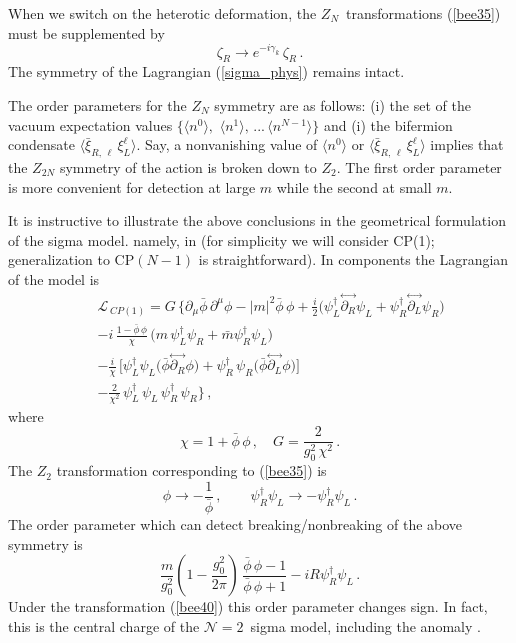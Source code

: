 \documentclass[epsfig,12pt]{article}
\def\beq{\begin{equation}}
\def\eeq{\end{equation}}
\def\beqn{\begin{eqnarray}}
\def\eeqn{\end{eqnarray}}
\newcommand{\ntwo}{${\mathcal N}=2\,$}
\newcommand{\zn}{$Z_N$}
\def\beqn{\begin{eqnarray}}
\def\eeqn{\end{eqnarray}}
\def\beq{\begin{equation}}
\def\eeq{\end{equation}}
\begin{document}
{When we switch on the heterotic deformation, the \zn\, transformations (\ref{bee35}) must be supplemented by
\beq
\zeta_R \to  e^{-i\gamma_k }\, \zeta_R\,.
\label{bee35p}
\eeq
The symmetry of the Lagrangian (\ref{sigma_phys}) remains intact.


The order parameters for the $Z_N$ symmetry are as follows:
(i) the set of the vacuum expectation values
$\{ \langle n^0\rangle,\,\, \langle n^1\rangle, \,...\, \langle n^{N-1}\rangle\}$
and (i) the bifermion condensate $\langle  \bar\xi_{R,\,\ell}\,\xi^\ell_L\rangle$.
Say, a nonvanishing value of $\langle n^0\rangle$ or  $\langle  \bar\xi_{R,\,\ell}\,\xi^\ell_L\rangle$ implies that the $Z_{2N}$ symmetry of the action is broken down to
$Z_2$. The first order parameter is more convenient for detection
at large $m$ while the second at small $m$. 

It is instructive to illustrate the above conclusions
in  the geometrical  formulation of the sigma model. namely, in
(for simplicity we will consider CP(1); generalization to CP$(N-1)$ is straightforward).
In components the Lagrangian of the model is
\beqn
&&
{\mathcal L}_{\,  CP(1)}= G\, \Big\{
\partial_\mu \bar{\phi}\, \partial^\mu\phi -|m|^2{\bar{\phi}\,\phi} 
+\frac{i}{2}\big(\psi_L^\dagger\!\stackrel{\leftrightarrow}{\partial_R}\!\psi_L 
+ \psi_R^\dagger\!\stackrel{\leftrightarrow}{\partial_L}\!\psi_R
\big)
\nonumber\\[1mm] 
&&
-i\,\frac{1-\bar{\phi}\,\phi}{\chi} \,\big(m\,\psi_L^\dagger \psi_R + \bar m
\psi_R^\dagger \psi_L
\big)
\nonumber\\[1mm] 
&&
-\frac{i}{\chi}\,  \big[\psi_L^\dagger \psi_L
\big(\bar{\phi} \!\stackrel{\leftrightarrow}{\partial_R}\!\phi
\big)+ \psi_R^\dagger\, \psi_R
\big(\bar{\phi}\!\stackrel{\leftrightarrow}{\partial_L}\!\phi
\big)
\big]
\nonumber\\[1mm]
&&
-
\frac{2}{\chi^2}\,\psi_L^\dagger\,\psi_L \,\psi_R^\dagger\,\psi_R
\Big\}\,,
\label{Aone}
\eeqn
where 
\beq
\chi = 1+\bar{\phi}\,\phi\,,\quad G= \frac{2}{g_0^2\,\chi^2}\,.
\eeq
The $Z_2$ transformation corresponding to (\ref{bee35}) is
\beq
\phi \to -\frac{1}{\bar{\phi}}\,,\qquad \psi_R^\dagger \psi_L\to -
\psi_R^\dagger \psi_L\,.
\label{bee40}
\eeq
 The order parameter which can detect breaking/nonbreaking of the above
symmetry is
\beq
\frac{m}{g_0^2} \left(1- \frac{g_0^2}{2\pi}
\right)\, \frac{\bar{\phi}\,\phi-1}{\bar{\phi}\,\phi+1} - 
i R \psi_R^\dagger \psi_L\,.
\eeq
Under the transformation (\ref{bee40}) this order parameter changes sign.
In fact, this is  the central charge of the \ntwo
sigma model, including the anomaly  \cite{ls,ls1}.


}
\end{document}
